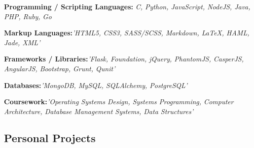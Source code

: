 \documentclass[12pt,a4paper,sans]{moderncv}        %
\begin{document}
\begin{itemize}

\item{\textbf{Programming / Scripting Languages:} \textit{C, Python, JavaScript, NodeJS, Java, PHP, Ruby, Go}

\small{}}

\vspace{6pt}

\item{\textbf{Markup Languages:}\textit{'HTML5, CSS3, SASS/SCSS, Markdown, LaTeX, HAML, Jade, XML'}

\vspace{3pt}

\small{}}

\vspace{6pt}

\item{\textbf{Frameworks / Libraries:}\textit{'Flask, Foundation, jQuery, PhantomJS, CasperJS, AngularJS, Bootstrap, Grunt, Qunit'}

\vspace{3pt}
\item{\textbf{Databases:}\textit{'MongoDB, MySQL, SQLAlchemy, PostgreSQL'} }

\vspace{3pt}

\small{}}

\vspace{6pt}

\item{\textbf{Coursework:}\textit{'Operating Systems Design, Systems Programming, Computer Architecture, Database Management Systems, Data Structures'} }

\vspace{3pt}

\small{}

\vspace{6pt}

\end{itemize}

\vspace{5pt}

\subsection{Personal Projects}

\vspace{5pt}
\end{document}
